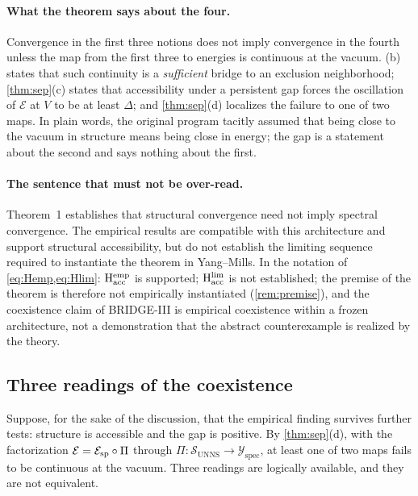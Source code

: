 \documentclass[11pt,a4paper]{article}
\theoremstyle{definition}
\theoremstyle{remark}
\newcommand{\SUNNS}{\mathcal{S}_{\mathrm{UNNS}}}
\newcommand{\Yspec}{\mathcal{Y}_{\mathrm{spec}}}
\newcommand{\Hacc}{\mathrm{H}_{\mathrm{acc}}}
\begin{document}
\paragraph{What the theorem says about the four.} Convergence in the first three notions does not imply convergence in the fourth unless the map from the first three to energies is continuous at the vacuum. (b) states that such continuity is a \emph{sufficient} bridge to an exclusion neighborhood; \cref{thm:sep}(c) states that accessibility under a persistent gap forces the oscillation of $\mathcal E$ at $V$ to be at least $\Delta$; and \cref{thm:sep}(d) localizes the failure to one of two maps. In plain words, the original program tacitly assumed that being close to the vacuum in structure means being close in energy; the gap is a statement about the second and says nothing about the first.

\paragraph{The sentence that must not be over-read.} Theorem~1 establishes that structural convergence need not imply spectral convergence. The empirical results are compatible with this architecture and support structural accessibility, but do not establish the limiting sequence required to instantiate the theorem in Yang--Mills. In the notation of \cref{eq:Hemp,eq:Hlim}: $\Hacc^{\rm emp}$ is supported; $\Hacc^{\rm lim}$ is not established; the premise of the theorem is therefore not empirically instantiated (\cref{rem:premise}), and the coexistence claim of BRIDGE-III is empirical coexistence within a frozen architecture, not a demonstration that the abstract counterexample is realized by the theory.

\subsection{Three readings of the coexistence}\label{ssec:readings}
Suppose, for the sake of the discussion, that the empirical finding survives further tests: structure is accessible and the gap is positive. By \cref{thm:sep}(d), with the factorization $\mathcal E=\mathcal E_{\rm sp}\circ\Pi$ through $\Pi:\SUNNS\to\Yspec$, at least one of two maps fails to be continuous at the vacuum. Three readings are logically available, and they are not equivalent.
\end{document}
